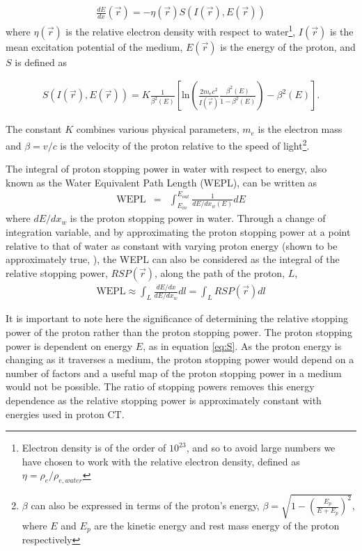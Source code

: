 \documentclass[11pt,a4paper]{article}
\begin{document}
\begin{eqnarray}
\frac{dE}{dx}(\vec{r}) = - \eta(\vec{r}) S(I(\vec{r}), E(\vec{r}))
\label{BB}
\end{eqnarray}
where $\eta(\vec{r})$ is the relative electron density with respect to water\footnote{Electron density is of the order of $10^{23}$, and so to avoid large numbers we have chosen to work with the relative electron density, defined as $\eta = \rho_e/\rho_{e,water}$}, $I(\vec{r})$ is the mean excitation potential of the medium, $E(\vec{r})$ is the energy of the proton, and $S$ is defined as

\begin{eqnarray}
\label{eq:S}
S(I(\vec{r}),E(\vec{r})) = K \frac{1}{\beta^2(E)}\left[ \text{ln}\left(\frac{2m_ec^2}{I(\vec{r})}  \frac{\beta^2(E)}{1-\beta^2(E)}\right) - \beta^2(E)\right].
\end{eqnarray}

The constant $K$ combines various physical parameters, $m_e$ is the electron mass and $\beta = v/c$ is the velocity of the proton relative to the speed of light\footnote{$\beta$ can also be expressed in terms of the proton's energy, $\beta = \sqrt{1 - \left(\frac{E_p}{E + E_p}\right)^2}$,
 where $E$ and $E_p$ are the kinetic energy and rest mass energy of the proton respectively}.

The integral of proton stopping power in water with respect to energy, also known as the Water Equivalent Path Length (WEPL), can be written as
\begin{eqnarray}
\text{WEPL} & =& \int_{E_{in}}^{E_{out}} \frac{1}{dE/dx_w(E)}dE  
\label{WEPL}
\end{eqnarray}
where $dE/dx_w$ is the proton stopping power in water. Through a change of integration variable, and by approximating the proton stopping power at a point relative to that of water as constant with varying proton energy (shown to be approximately true, \cite{schneider1996calibration}), the WEPL can also be considered as the integral of the relative stopping power, $RSP(\vec{r})$, along the path of the proton, $L$,
\begin{eqnarray}
\text{WEPL} \approx  \int_L \frac{dE/dx}{dE/dx_{w}}dl = \int_L RSP(\vec{r}) dl
\label{RSP}
\end{eqnarray}

It is important to note here the significance of determining the relative stopping power of the proton rather than the proton stopping power. The proton stopping power is dependent on energy $E$, as in equation \ref{eq:S}. As the proton energy is changing as it traverses a medium, the proton stopping power would depend on a number of factors and a useful map of the proton stopping power in a medium would not be possible. The ratio of stopping powers removes this energy dependence as the relative stopping power is approximately constant with energies used in proton CT.
\end{document}
